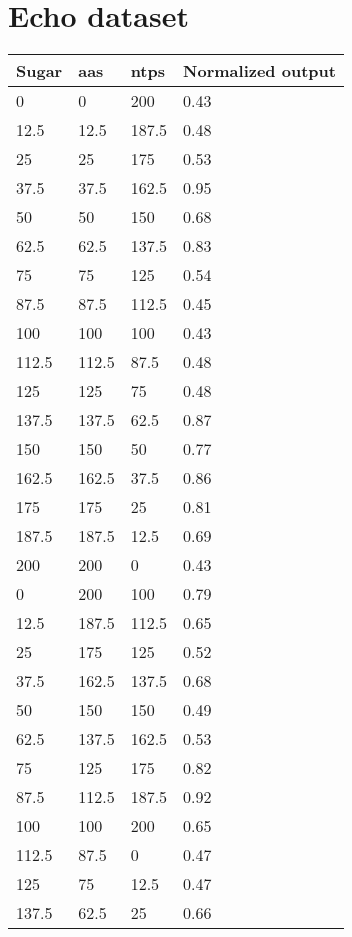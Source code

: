 \section{Echo dataset}

\begin{longtable}{lll | l}
Sugar & \glspl{aa} & \glspl{ntp} & Normalized output   \\ \hline
0        & 0     & 200   & 0.43 \\
12.5     & 12.5  & 187.5 & 0.48 \\
25       & 25    & 175   & 0.53 \\
37.5     & 37.5  & 162.5 & 0.95 \\
50       & 50    & 150   & 0.68 \\
62.5     & 62.5  & 137.5 & 0.83 \\
75       & 75    & 125   & 0.54 \\
87.5     & 87.5  & 112.5 & 0.45 \\
100      & 100   & 100   & 0.43 \\
112.5    & 112.5 & 87.5  & 0.48 \\
125      & 125   & 75    & 0.48 \\
137.5    & 137.5 & 62.5  & 0.87 \\
150      & 150   & 50    & 0.77 \\
162.5    & 162.5 & 37.5  & 0.86 \\
175      & 175   & 25    & 0.81 \\
187.5    & 187.5 & 12.5  & 0.69 \\
200      & 200   & 0     & 0.43 \\
0        & 200   & 100   & 0.79 \\
12.5     & 187.5 & 112.5 & 0.65 \\
25       & 175   & 125   & 0.52 \\
37.5     & 162.5 & 137.5 & 0.68 \\
50       & 150   & 150   & 0.49 \\
62.5     & 137.5 & 162.5 & 0.53 \\
75       & 125   & 175   & 0.82 \\
87.5     & 112.5 & 187.5 & 0.92 \\
100      & 100   & 200   & 0.65 \\
112.5    & 87.5  & 0     & 0.47 \\
125      & 75    & 12.5  & 0.47 \\
137.5    & 62.5  & 25    & 0.66 \\

\end{longtable}
